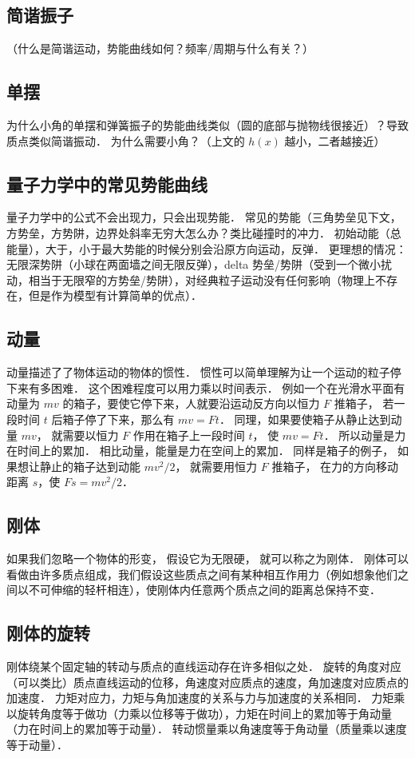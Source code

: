 \subsection{简谐振子}
（什么是简谐运动，势能曲线如何？频率/周期与什么有关？）

\subsection{单摆}
为什么小角的单摆和弹簧振子的势能曲线类似（圆的底部与抛物线很接近）？导致质点类似简谐振动． 为什么需要小角？（上文的 $h(x)$ 越小，二者越接近）

\subsection{量子力学中的常见势能曲线}
量子力学中的公式不会出现力，只会出现势能． 常见的势能（三角势垒见下文，方势垒，方势阱，边界处斜率无穷大怎么办？类比碰撞时的冲力． 初始动能（总能量），大于，小于最大势能的时候分别会沿原方向运动，反弹． 更理想的情况：无限深势阱（小球在两面墙之间无限反弹），delta 势垒/势阱（受到一个微小扰动，相当于无限窄的方势垒/势阱），对经典粒子运动没有任何影响（物理上不存在，但是作为模型有计算简单的优点）．

\subsection{动量}
动量描述了了物体运动的物体的惯性． 惯性可以简单理解为让一个运动的粒子停下来有多困难． 这个困难程度可以用力乘以时间表示． 例如一个在光滑水平面有动量为 $mv$ 的箱子，要使它停下来，人就要沿运动反方向以恒力 $F$ 推箱子， 若一段时间 $t$ 后箱子停了下来，那么有 $mv = Ft$． 同理，如果要使箱子从静止达到动量 $mv$， 就需要以恒力 $F$ 作用在箱子上一段时间 $t$， 使 $mv = Ft$． 所以动量是力在时间上的累加． 相比动量，能量是力在空间上的累加． 同样是箱子的例子， 如果想让静止的箱子达到动能 $mv^2/2$， 就需要用恒力 $F$ 推箱子， 在力的方向移动距离 $s$，使 $Fs = mv^2/2$．

\subsection{刚体}
如果我们忽略一个物体的形变， 假设它为无限硬， 就可以称之为刚体． 刚体可以看做由许多质点组成，我们假设这些质点之间有某种相互作用力（例如想象他们之间以不可伸缩的轻杆相连），使刚体内任意两个质点之间的距离总保持不变．

\subsection{刚体的旋转}
刚体绕某个固定轴的转动与质点的直线运动存在许多相似之处． 旋转的角度对应（可以类比）质点直线运动的位移，角速度对应质点的速度，角加速度对应质点的加速度． 力矩对应力，力矩与角加速度的关系与力与加速度的关系相同． 力矩乘以旋转角度等于做功（力乘以位移等于做功），力矩在时间上的累加等于角动量（力在时间上的累加等于动量）． 转动惯量乘以角速度等于角动量（质量乘以速度等于动量）．

